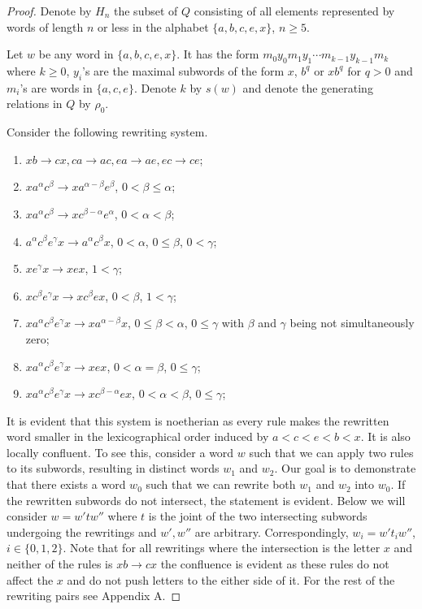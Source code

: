\documentclass[10pt,a4paper]{amsart}
\begin{document}
\begin{proof}
Denote by $H_n$ the subset of $Q$ consisting of all elements represented by words of length $n$ or less in the alphabet $\{a,b,c,e,x\}$, $n \ge 5$.

Let $w$ be any word in $\{a,b,c,e,x\}$. It has the form  $m_0 y_0 m_1 y_1 \cdots m_{k-1} y_{k-1} m_k$ where $k \ge 0$, $y_i$'s are the maximal subwords of the form $x$, $b^q$ or $x b^q$ for $q > 0$ and $m_i$'s are words in $\{a,c,e\}$. Denote $k$ by $s(w)$ and denote the generating relations in $Q$ by $\rho_0$.

Consider the following rewriting system.

\begin{enumerate}
\item $xb \rightarrow cx, ca \rightarrow ac, ea \rightarrow ae, ec \rightarrow ce$;

\item $x a^\alpha c^\beta \rightarrow x a^{\alpha - \beta} e^\beta$, $0< \beta \le \alpha$;
\item $x a^\alpha c^\beta \rightarrow x c^{\beta - \alpha} e^\alpha$, $0< \alpha < \beta$;

\item $ a^\alpha c^\beta e^\gamma x  \rightarrow a^\alpha c^\beta x $, $0<\alpha$, $0 \le \beta$, $0 < \gamma$;

\item $x e^\gamma x \rightarrow xex$, $1< \gamma$;
\item $x c^\beta e^\gamma x \rightarrow x c^{\beta} e x$, $0< \beta$, $1 <\gamma$;
\item $x a^\alpha c^\beta e^\gamma x \rightarrow x a^{\alpha - \beta} x$, $0\le \beta < \alpha$, $0\le \gamma$ with $\beta$ and $\gamma$ being not simultaneously zero;
\item $x a^\alpha c^\beta e^\gamma x\rightarrow x e x$, $0 <\alpha = \beta$, $0\le \gamma$;
\item $x a^\alpha c^\beta e^\gamma x\rightarrow x c^{\beta - \alpha} e x$, $0 <\alpha < \beta$, $0\le \gamma$;
\end{enumerate}

It is evident that this system is noetherian as every rule makes the rewritten word smaller in the lexicographical order induced by $a<c<e<b<x$. It is also locally confluent. To see this, consider a word $w$ such that we can apply two rules to its subwords, resulting in distinct words $w_1$ and $w_2$. Our goal is to demonstrate that there exists a word $w_0$ such that we can rewrite both $w_1$ and $w_2$ into $w_0$. If the rewritten subwords do not intersect, the statement is evident. Below we will consider $w = w' t w''$ where $t$ is the joint of the two intersecting subwords undergoing the rewritings and $w', w''$ are arbitrary. Correspondingly, $w_i = w' t_i w''$, $i \in \{0,1,2\}$. Note that for all rewritings where the intersection is the letter $x$ and neither of the rules is $xb \rightarrow cx$ the confluence is evident as these rules do not affect the $x$ and do not push letters to the either side of it. For the rest of the rewriting pairs see Appendix A.


\end{proof}
\end{document}
